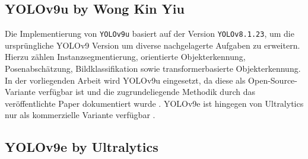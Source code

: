 
\subsection{YOLOv9u by Wong Kin Yiu}
\label{subsec:yolov9u}

Die Implementierung von \texttt{YOLOv9u} basiert auf der Version \texttt{YOLOv8.1.23}\cite{yolo_v9u_github}, um die ursprüngliche \acrshort{YOLO}v9 Version um diverse nachgelagerte Aufgaben zu erweitern. Hierzu zählen Instanzsegmentierung, orientierte Objekterkennung, Posenabschätzung, Bildklassifikation sowie transformerbasierte Objekterkennung\cite{wang2024}. In der vorliegenden Arbeit wird \acrshort{YOLO}v9u eingesetzt, da diese als Open-Source-Variante verfügbar ist und die zugrundeliegende Methodik durch das veröffentlichte Paper dokumentiert wurde \cite{wang2024_sapkota}. \acrshort{YOLO}v9e ist hingegen von Ultralytics nur als kommerzielle Variante verfügbar \cite{ultralyics_2023}.

 



\subsection{YOLOv9e by Ultralytics}
\label{subsec:yolov9e}

